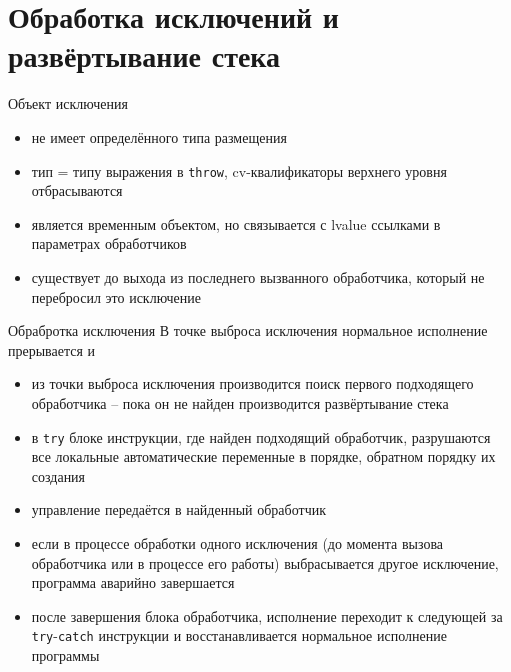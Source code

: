 \documentclass[unknownkeysallowed,xcolor=table]{beamer}
\begin{document}
\section{Обработка исключений и развёртывание стека}

\begin{frame}{Объект исключения}
  \begin{itemize}
    \item не имеет определённого типа размещения \vspace{1em}
    \item тип = типу выражения в \lstinline{throw}, cv-квалификаторы верхнего уровня отбрасываются \vspace{1em}
    \item является временным объектом, но связывается с lvalue ссылками в параметрах обработчиков \vspace{1em}
    \item существует до выхода из последнего вызванного обработчика, который не перебросил это исключение
  \end{itemize}
\end{frame}

\begin{frame}{Обрабротка исключения}
  В точке выброса исключения нормальное исполнение прерывается и
  \begin{itemize}
    \item из точки выброса исключения производится поиск первого подходящего обработчика -- пока он не найден производится развёртывание стека \vspace{1em}
    \item в \lstinline{try} блоке инструкции, где найден подходящий обработчик, разрушаются все локальные автоматические переменные в порядке, обратном порядку их
      создания \vspace{1em}
    \item управление передаётся в найденный обработчик \vspace{1em}
    \item если в процессе обработки одного исключения (до момента вызова обработчика или в процессе его работы) выбрасывается другое исключение, программа аварийно
      завершается \vspace{1em}
    \item после завершения блока обработчика, исполнение переходит к следующей за \lstinline{try}-\lstinline{catch} инструкции и восстанавливается нормальное
      исполнение программы
  \end{itemize}
\end{frame}
\end{document}
